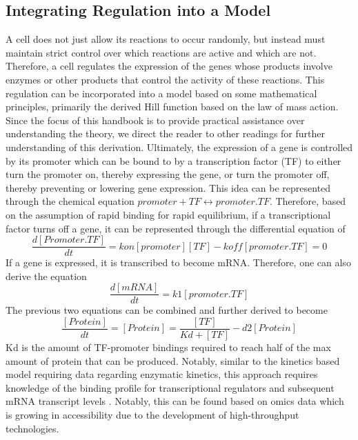 \subsection{Integrating Regulation into a Model}
A cell does not just allow its reactions to occur randomly, but instead must maintain strict control over which reactions are active and which are not. Therefore, a cell regulates the expression of the genes whose products involve enzymes or other products that control the activity of these reactions. This regulation can be incorporated into a model based on some mathematical principles, primarily the derived Hill function based on the law of mass action. Since the focus of this handbook is to provide practical assistance over understanding the theory, we direct the reader to other readings for further understanding of this derivation. Ultimately, the expression of a gene is controlled by its promoter which can be bound to by a transcription factor (TF) to either turn the promoter on, thereby expressing the gene, or turn the promoter off, thereby preventing or lowering gene expression. This idea can be represented through the chemical equation $promoter+TF \leftrightarrow promoter.TF$. Therefore, based on the assumption of rapid binding for rapid equilibrium, if a transcriptional factor turns off a gene, it can be represented through the differential equation of
 $$\frac{d[Promoter.TF]}{dt}=kon[promoter][TF]-koff[promoter.TF]=0$$
If a gene is expressed, it is transcribed to become mRNA. Therefore, one can also derive the equation $$\frac{d[mRNA]}{dt}=k1[promoter.TF]$$ The previous two equations can be combined and further derived to become
$$\frac{[Protein]}{dt}=[Protein]=\frac{[TF]}{Kd+[TF]}-d2[Protein]$$ 
Kd is the amount of TF-promoter bindings required to reach half of the max amount of protein that can be produced. Notably, similar to the kinetics based model requiring data regarding enzymatic kinetics, this approach requires knowledge of the binding profile for transcriptional regulators and subsequent mRNA transcript levels \parencite{Vivek-Anath2016}. Notably, this can be found based on omics data which is growing in accessibility due to the development of high-throughput technologies.



